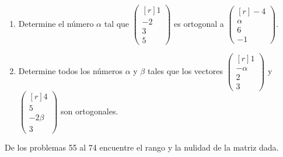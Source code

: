 \begin{enumerate}[start=53]
    \item Determine el número $\alpha$ tal que $\begin{pmatrix*}[r] 1 \\ -2 \\ 3 \\ 5 \end{pmatrix*}$ es ortogonal a $\begin{pmatrix*}[r] -4 \\ \alpha \\ 6 \\ -1 \end{pmatrix*}$.
    \item Determine todos los números $\alpha$ y $\beta$ tales que los vectores $\begin{pmatrix*}[r]1 \\ -\alpha \\ 2 \\ 3\end{pmatrix*}$ y $\begin{pmatrix*}[r]4 \\ 5 \\ -2 \beta \\ 3\end{pmatrix*}$ son ortogonales.
\end{enumerate}
De los problemas 55 al 74 encuentre el rango y la nulidad de la matriz dada.
